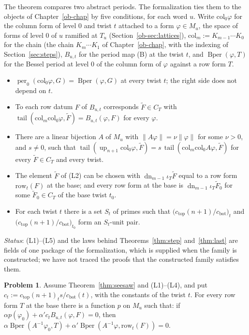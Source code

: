 \documentclass[reqno]{amsart}
\newcounter{chap}
\theoremstyle{definition}
\newtheorem{problem}{Problem}[section]
\theoremstyle{plain}
\theoremstyle{remark}
\newcommand{\per}{\operatorname{per}}
\newcommand{\tail}{\operatorname{tail}}
\newcommand{\up}{\operatorname{up}}
\newcommand{\dn}{\operatorname{dn}}
\newcommand{\Bper}{\operatorname{Bper}}
\newcommand{\cTop}{c_{\mathrm{top}}}
\newcommand{\cBot}{c_{\mathrm{bot}}}
\begin{document}
The theorem compares two abstract periods.  The formalization ties them to the objects of Chapter~\ref{ob-chap} by five conditions, for each word \(u\).  Write \(\mathrm{col}_0\varphi\) for the column form of level \(0\) and twist \(t\) attached to a form \(\varphi\in M_u\), the space of forms of level \(0\) of \(u\) ramified at \(T_u\) (Section~\ref{ob-sec:lattices}), \(\mathrm{col}_m:=K_{m-1}\cdots K_0\) for the chain (the chain \(K_m\cdots K_1\) of Chapter~\ref{ob-chap}, with the indexing of Section~\ref{sec:steps}), \(B_{u,t}\) for the period map (B) at the twist \(t\), and \(\Bper(\varphi,T)\) for the Bessel period at level \(0\) of the column form of \(\varphi\) against a row form \(T\).
\begin{itemize}
\item[(L1)] \(\per_0(\mathrm{col}_0\varphi,G)=\Bper(\varphi,G)\) at every twist \(t\); the right side does not depend on \(t\).
\item[(L2)] To each row datum \(F\) of \(B_{u,t}\) corresponds \(\tilde F\in C_T\) with \(\tail(\mathrm{col}_m\mathrm{col}_0\varphi,\tilde F)=B_{u,t}(\varphi,F)\) for every \(\varphi\).
\item[(L3)] There are a linear bijection \(A\) of \(M_u\) with \(\lVert A\varphi\rVert=\nu\lVert\varphi\rVert\) for some \(\nu>0\), and \(s\ne0\), such that \(\tail(\up_{n+1}\mathrm{col}_0\varphi,\tilde F)=s\,\tail(\mathrm{col}_m\mathrm{col}_0A\varphi,\tilde F)\) for every \(\tilde F\in C_T\) and every twist.
\item[(L4)] The element \(\tilde F\) of (L2) can be chosen with \(\dn_{m-1}\iota_T\tilde F\) equal to a row form \(\mathrm{row}_t(F)\) at the base; and every row form at the base is \(\dn_{m-1}\iota_T\tilde F_0\) for some \(\tilde F_0\in C_T\) of the base twist \(t_0\).
\item[(L5)] For each twist \(t\) there is a set \(S_t\) of primes such that \(\bigl(\cTop(n+1)/\cBot\bigr)_t\) and \(\bigl(\cTop(n+1)/\cBot\bigr)_{t_0}\) form an \(S_t\)-unit pair.
\end{itemize}
\emph{Status}: (L1)--(L5) and the laws behind Theorems~\ref{thm:step} and~\ref{thm:last} are fields of one package of the formalization, which is supplied when the family is constructed; we have not traced the proofs that the constructed family satisfies them.

\begin{problem}\label{pr:rel}
Assume Theorem~\ref{thm:seesaw} and (L1)--(L4), and put \(c_t:=\cTop(n+1)_ts/\cBot(t)\), with the constants of the twist \(t\).  For every row form \(T\) at the base there is a function \(p\) on \(M_u\) such that: if \(\alpha p(\varphi_0)+\alpha'c_tB_{u,t}(\varphi,F)=0\), then \(\alpha\Bper(A^{-1}\varphi_0,T)+\alpha'\Bper(A^{-1}\varphi,\mathrm{row}_t(F))=0\).
\end{problem}
\end{document}
